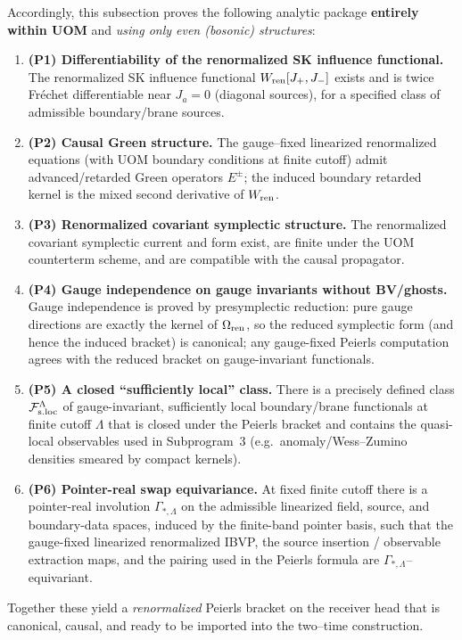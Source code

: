 \documentclass[10pt]{article}
\theoremstyle{definition}
\theoremstyle{plain}
\begin{document}
Accordingly, this subsection proves the following analytic package \textbf{entirely within UOM}
and \emph{using only even (bosonic) structures}:
\begin{enumerate}[label=\textbf{UOM-P\arabic*},leftmargin=2.4em,itemsep=2pt]
\item \textbf{(P1) Differentiability of the renormalized SK influence functional.}
The renormalized SK influence functional $W_{\rm ren}[J_+,J_-]$ exists and is twice
Fr\'echet differentiable near $J_a=0$ (diagonal sources), for a specified class of
admissible boundary/brane sources.
\item \textbf{(P2) Causal Green structure.}
The gauge--fixed linearized renormalized equations (with UOM boundary conditions at finite cutoff)
admit advanced/retarded Green operators $E^\pm$; the induced boundary retarded kernel is the mixed
second derivative of $W_{\rm ren}$.
\item \textbf{(P3) Renormalized covariant symplectic structure.}
The renormalized covariant symplectic current and form exist, are finite under the UOM counterterm scheme,
and are compatible with the causal propagator.
\item \textbf{(P4) Gauge independence on gauge invariants without BV/ghosts.}
Gauge independence is proved by presymplectic reduction: pure gauge directions are exactly the kernel of
$\Omega_{\rm ren}$, so the reduced symplectic form (and hence the induced bracket) is canonical; any
gauge-fixed Peierls computation agrees with the reduced bracket on gauge-invariant functionals.
\item \textbf{(P5) A closed ``sufficiently local'' class.}
There is a precisely defined class $\mathcal F_{\rm s.loc}^\Lambda$ of gauge-invariant, sufficiently local
boundary/brane functionals at finite cutoff $\Lambda$ that is closed under the Peierls bracket and contains
the quasi-local observables used in Subprogram~3 (e.g.\ anomaly/Wess--Zumino densities smeared by compact kernels).
\item \textbf{(P6) Pointer-real swap equivariance.}
At fixed finite cutoff there is a pointer-real involution $\Gamma_{*,\Lambda}$ on the admissible linearized
field, source, and boundary-data spaces, induced by the finite-band pointer basis, such that the gauge-fixed
linearized renormalized IBVP, the source insertion / observable extraction maps, and the pairing used in the
Peierls formula are $\Gamma_{*,\Lambda}$--equivariant.
\end{enumerate}
Together these yield a \emph{renormalized} Peierls bracket on the receiver head that is canonical, causal,
and ready to be imported into the two--time construction.
\end{document}
